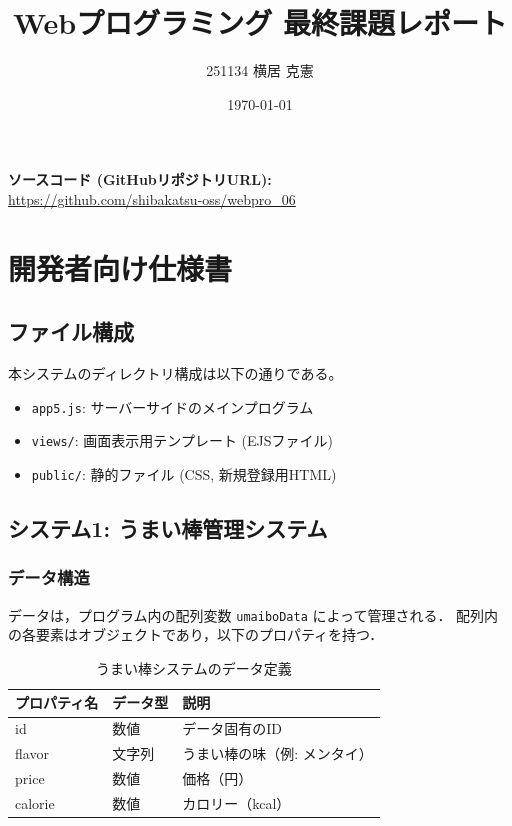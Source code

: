 \documentclass[uplatex,dvipdfmx]{jsarticle}
\title{Webプログラミング 最終課題レポート}
\author{251134 横居 克憲}
\date{\today}
\begin{document}
\maketitle

\begin{screen}
\textbf{ソースコード (GitHubリポジトリURL):}\\
\url{https://github.com/shibakatsu-oss/webpro_06}
\end{screen}

\vspace{1cm} 

\section{開発者向け仕様書}

\subsection{ファイル構成}
本システムのディレクトリ構成は以下の通りである。
\begin{itemize}
    \item \texttt{app5.js}: サーバーサイドのメインプログラム
    \item \texttt{views/}: 画面表示用テンプレート (EJSファイル)
    \item \texttt{public/}: 静的ファイル (CSS, 新規登録用HTML)
\end{itemize}

\subsection{システム1: うまい棒管理システム}

\subsubsection{データ構造}
データは，プログラム内の配列変数 \texttt{umaiboData} によって管理される．
配列内の各要素はオブジェクトであり，以下のプロパティを持つ．

\begin{table}[h]
    \centering
    \caption{うまい棒システムのデータ定義}
    \begin{tabular}{|l|l|l|}
        \hline
        プロパティ名 & データ型 & 説明 \\
        \hline
        id & 数値 & データ固有のID \\
        flavor & 文字列 & うまい棒の味（例: メンタイ） \\
        price & 数値 & 価格（円） \\
        calorie & 数値 & カロリー（kcal） \\
        \hline
    \end{tabular}
\end{table}
\end{document}
